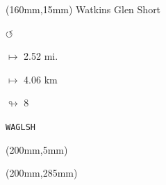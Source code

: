 \begin{textblock*}{40mm}(160mm,15mm)%
Watkins Glen Short
\par \Huge$\circlearrowleft$
\Large
\par$\mapsto$ 2.52 mi.
\par$\mapsto$ 4.06 km
\par$\looparrowright$ 8
\par\hfill\tiny\tt WAGLSH\\
\end{textblock*}
\begin{textblock*}{20mm}(200mm,5mm)%
\fbox{\thepage}
\end{textblock*}
\begin{textblock*}{20mm}(200mm,285mm)%
\fbox{\thepage}
\end{textblock*}
\null\newpage

